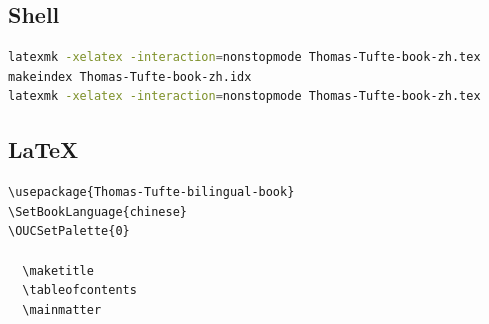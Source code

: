 \subsection{Shell}
\begin{lstlisting}[language=bash]
latexmk -xelatex -interaction=nonstopmode Thomas-Tufte-book-zh.tex
makeindex Thomas-Tufte-book-zh.idx
latexmk -xelatex -interaction=nonstopmode Thomas-Tufte-book-zh.tex
\end{lstlisting}

\subsection{LaTeX}
\begin{lstlisting}[language={[LaTeX]TeX}]
\usepackage{Thomas-Tufte-bilingual-book}
\SetBookLanguage{chinese}
\OUCSetPalette{0}

  \maketitle
  \tableofcontents
  \mainmatter

\end{lstlisting}

\cleardoublepage
